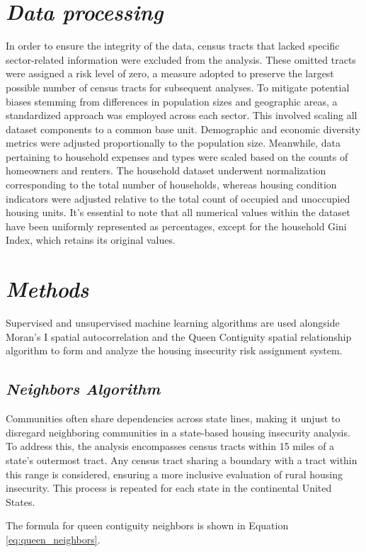 \section{\textit{Data processing}}
In order to ensure the integrity of the data, census tracts that lacked specific sector-related information were excluded from the analysis. These omitted tracts were assigned a risk level of zero, a measure adopted to preserve the largest possible number of census tracts for subsequent analyses. To mitigate potential biases stemming from differences in population sizes and geographic areas, a standardized approach was employed across each sector. This involved scaling all dataset components to a common base unit. Demographic and economic diversity metrics were adjusted proportionally to the population size. Meanwhile, data pertaining to household expenses and types were scaled based on the counts of homeowners and renters. The household dataset underwent normalization corresponding to the total number of households, whereas housing condition indicators were adjusted relative to the total count of occupied and unoccupied housing units. It's essential to note that all numerical values within the dataset have been uniformly represented as percentages, except for the household Gini Index, which retains its original values.

\section{\textit{Methods}}
Supervised and unsupervised machine learning algorithms are used alongside Moran's I spatial autocorrelation and the Queen Contiguity spatial relationship algorithm to form and analyze the housing insecurity risk assignment system.

\subsection{\textit{Neighbors Algorithm}}

Communities often share dependencies across state lines, making it unjust to disregard neighboring communities in a state-based housing insecurity analysis. To address this, the analysis encompasses census tracts within 15 miles of a state's outermost tract. Any census tract sharing a boundary with a tract within this range is considered, ensuring a more inclusive evaluation of rural housing insecurity. This process is repeated for each state in the continental United States.

The formula for queen contiguity neighbors is shown in Equation \ref{eq:queen_neighbors}.

